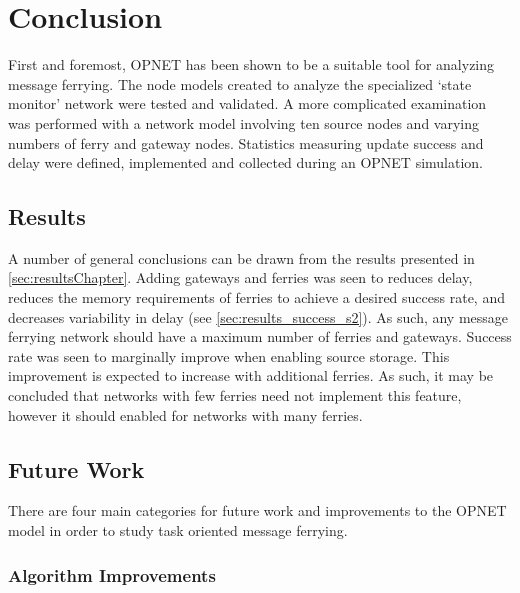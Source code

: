 \chapter{Conclusion} 

First and foremost, OPNET has been shown to be a suitable tool for analyzing message ferrying.
The node models created to analyze the specialized \lq{}state monitor\rq{} network were tested and validated.
A more complicated examination was performed with a network model involving ten source nodes and varying numbers of ferry and gateway nodes.
Statistics measuring update success and delay were defined, implemented and collected during an OPNET simulation.


\section{Results}

A number of general conclusions can be drawn from the results presented in \ref{sec:resultsChapter}.
Adding gateways and ferries was seen to reduces delay, reduces the memory requirements of ferries to achieve a desired success rate, and decreases variability in delay (see \ref{sec:results_success_s2}).
As such, any message ferrying network should have a maximum number of ferries and gateways.
Success rate was seen to marginally improve when enabling source storage.
This improvement is expected to increase with additional ferries.
As such, it may be concluded that networks with few ferries need not implement this feature, however it should enabled for networks with many ferries.



\section{Future Work}

There are four main categories for future work and improvements to the OPNET model in order to study task oriented message ferrying.

\subsection{Algorithm Improvements}

